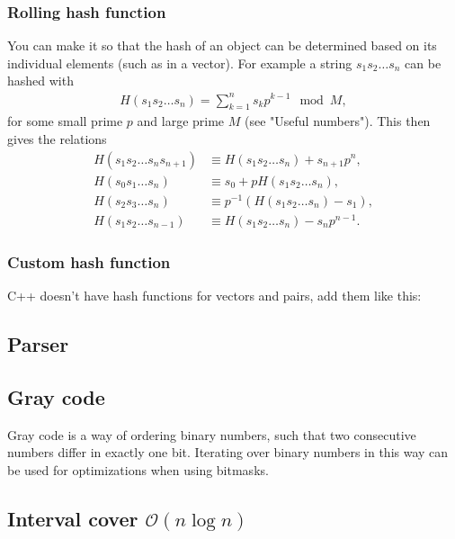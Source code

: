 \subsubsection{Rolling hash function}
You can make it so that the hash of an object can be determined based on its individual elements (such as in a vector). For example a string $s_1s_2\dots s_n$ can be hashed with
\begin{align*}
    H(s_1s_2\dots s_n) = \sum_{k=1}^n s_kp^{k-1}\mod M,
\end{align*}
for some small prime $p$ and large prime $M$ (see "Useful numbers"). This then gives the relations
\begin{align*}
    H(s_1s_2\dots s_ns_{n+1}) &\equiv H(s_1s_2\dots s_n) + s_{n+1}p^{n}, \\
    H(s_0s_1\dots s_n) &\equiv s_0 + pH(s_1s_2\dots s_n), \\
    H(s_2s_3\dots s_n) &\equiv p^{-1}\left(H(s_1s_2\dots s_n) - s_1\right), \\
    H(s_1s_2 \dots s_{n-1}) &\equiv H(s_1s_2\dots s_n) - s_{n}p^{n - 1}.
\end{align*}

\subsubsection{Custom hash function}
C++ doesn't have hash functions for vectors and pairs, add them like this:



\subsection{Parser}




\subsection{Gray code}
Gray code is a way of ordering binary numbers, such that two consecutive numbers differ in exactly one bit. Iterating over binary numbers in this way can be used for optimizations when using bitmasks.




\subsection{Interval cover $\mathcal O(n\log n)$}

